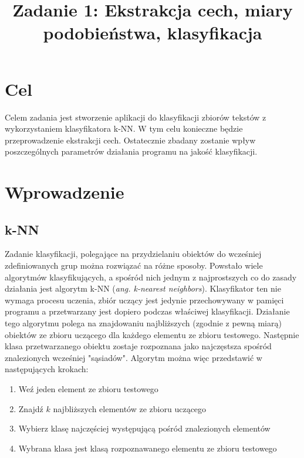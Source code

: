 \documentclass{classrep}
\author{
    \studentinfo{Jan Karwowski}{216793} \and
    \studentinfo{Kamil Kowalewski}{216806}
}
\title{Zadanie 1: Ekstrakcja cech, miary podobieństwa, klasyfikacja}
\begin{document}
    \maketitle
    \thispagestyle{fancyplain}

    \section{Cel} {
        Celem zadania jest stworzenie aplikacji do klasyfikacji zbiorów tekstów z wykorzystaniem
        klasyfikatora k-NN. W tym celu konieczne będzie przeprowadzenie ekstrakcji cech. Ostatecznie
        zbadany zostanie wpływ poszczególnych parametrów działania programu na jakość klasyfikacji.
    }
    \section{Wprowadzenie} {

        \subsection{k-NN} \label{knn} {
            Zadanie klasyfikacji, polegające na przydzielaniu obiektów do wcześniej zdefiniowanych grup
            można rozwiązać na różne sposoby. Powstało wiele algorytmów klasyfikujących, a spośród nich
            jednym z najprostszych co do zasady działania jest algorytm k-NN (\emph{ang. k-nearest neighbors}).
            Klasyfikator ten nie wymaga procesu uczenia, zbiór uczący jest jedynie przechowywany w pamięci
            programu a przetwarzany jest dopiero podczas właściwej klasyfikacji. Działanie tego algorytmu polega
            na znajdowaniu najbliższych (zgodnie z pewną miarą) obiektów ze zbioru uczącego dla każdego elementu
            ze zbioru testowego. Następnie klasa przetwarzanego obiektu zostaje rozpoznana jako najczęstsza spośród
            znalezionych wcześniej "sąsiadów". Algorytm można więc przedstawić w następujących krokach:
            \begin{enumerate}
                \item Weź jeden element ze zbioru testowego
                \item Znajdź $k$ najbliższych elementów ze zbioru uczącego
                \item Wybierz klasę najczęściej występującą pośród znalezionych elementów
                \item Wybrana klasa jest klasą rozpoznawanego elementu ze zbioru testowego
            \end{enumerate}
        }

}
\end{document}
